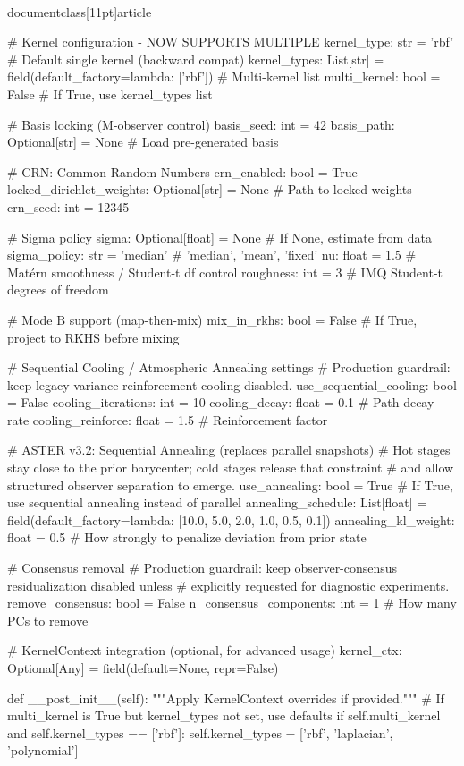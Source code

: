 \\documentclass[11pt]{article}
\begin{document}
\begin{CodeBlock}
    # Kernel configuration - NOW SUPPORTS MULTIPLE
    kernel_type: str = 'rbf'  # Default single kernel (backward compat)
    kernel_types: List[str] = field(default_factory=lambda: ['rbf'])  # Multi-kernel list
    multi_kernel: bool = False  # If True, use kernel_types list
    
    # Basis locking (M-observer control)
    basis_seed: int = 42
    basis_path: Optional[str] = None  # Load pre-generated basis
    
    # CRN: Common Random Numbers
    crn_enabled: bool = True
    locked_dirichlet_weights: Optional[str] = None  # Path to locked weights
    crn_seed: int = 12345
    
    # Sigma policy
    sigma: Optional[float] = None  # If None, estimate from data
    sigma_policy: str = 'median'   # 'median', 'mean', 'fixed'
    nu: float = 1.5                # Matérn smoothness / Student-t df control
    roughness: int = 3             # IMQ Student-t degrees of freedom
    
    # Mode B support (map-then-mix)
    mix_in_rkhs: bool = False  # If True, project to RKHS before mixing
    
    # Sequential Cooling / Atmospheric Annealing settings
    # Production guardrail: keep legacy variance-reinforcement cooling disabled.
    use_sequential_cooling: bool = False
    cooling_iterations: int = 10
    cooling_decay: float = 0.1  # Path decay rate
    cooling_reinforce: float = 1.5  # Reinforcement factor

    # ASTER v3.2: Sequential Annealing (replaces parallel snapshots)
    # Hot stages stay close to the prior barycenter; cold stages release that constraint
    # and allow structured observer separation to emerge.
    use_annealing: bool = True  # If True, use sequential annealing instead of parallel
    annealing_schedule: List[float] = field(default_factory=lambda: [10.0, 5.0, 2.0, 1.0, 0.5, 0.1])
    annealing_kl_weight: float = 0.5  # How strongly to penalize deviation from prior state

    # Consensus removal
    # Production guardrail: keep observer-consensus residualization disabled unless
    # explicitly requested for diagnostic experiments.
    remove_consensus: bool = False
    n_consensus_components: int = 1  # How many PCs to remove
    
    # KernelContext integration (optional, for advanced usage)
    kernel_ctx: Optional[Any] = field(default=None, repr=False)
    
    def __post_init__(self):
        """Apply KernelContext overrides if provided."""
        # If multi_kernel is True but kernel_types not set, use defaults
        if self.multi_kernel and self.kernel_types == ['rbf']:
            self.kernel_types = ['rbf', 'laplacian', 'polynomial']
        

\end{CodeBlock}
\end{document}
